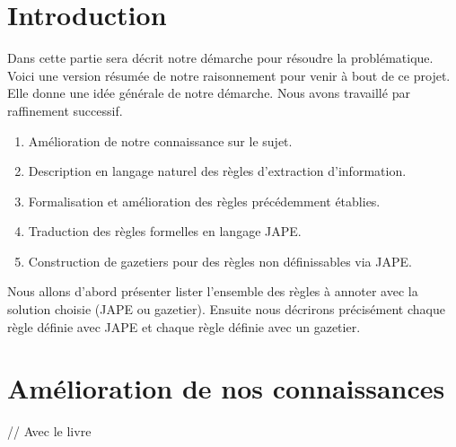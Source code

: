 \documentclass[a4paper, 11pt]{book}
\begin{document}
\section*{Introduction}
Dans cette partie sera décrit notre démarche pour résoudre la problématique. 
Voici une version résumée de notre raisonnement pour venir à bout de ce projet. Elle donne une idée générale de notre démarche. Nous avons travaillé par raffinement successif.
\begin{enumerate}
\item Amélioration de notre connaissance sur le sujet.
\item Description en langage naturel des règles d'extraction d'information.
\item Formalisation et amélioration des règles précédemment établies.
\item Traduction des règles formelles en langage JAPE.
\item Construction de gazetiers pour des règles non définissables via JAPE.
\end{enumerate}
Nous allons d'abord présenter lister l'ensemble des règles à annoter avec la solution choisie (JAPE ou gazetier). Ensuite nous décrirons précisément chaque règle définie avec JAPE et chaque règle définie avec un gazetier.

\section{Amélioration de nos connaissances}
// Avec le livre 

\newpage
\end{document}
